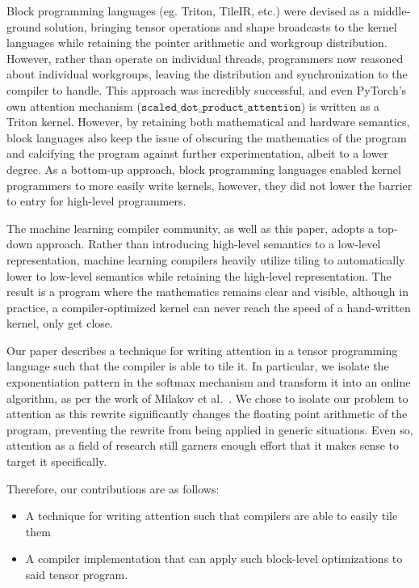 \documentclass[review, anonymous, acmsmall]{acmart}
\begin{document}
Block programming languages (eg. Triton, TileIR, etc.) were devised as a middle-ground solution, bringing tensor operations and shape broadcasts to the kernel languages while retaining the pointer arithmetic and workgroup distribution. However, rather than operate on individual threads, programmers now reasoned about individual workgroups, leaving the distribution and synchronization to the compiler to handle. This approach was incredibly successful, and even PyTorch's own attention mechanism ($\texttt{scaled\_dot\_product\_attention}$) is written as a Triton kernel. However, by retaining both mathematical and hardware semantics, block languages also keep the issue of obscuring the mathematics of the program and calcifying the program against further experimentation, albeit to a lower degree. As a bottom-up approach, block programming languages enabled kernel programmers to more easily write kernels, however, they did not lower the barrier to entry for high-level programmers.

The machine learning compiler community, as well as this paper, adopts a top-down approach. Rather than introducing high-level semantics to a low-level representation, machine learning compilers heavily utilize tiling to automatically lower to low-level semantics while retaining the high-level representation. The result is a program where the mathematics remains clear and visible, although in practice, a compiler-optimized kernel can never reach the speed of a hand-written kernel, only get close.

Our paper describes a technique for writing attention in a tensor programming language such that the compiler is able to tile it. In particular, we isolate the exponentiation pattern in the softmax mechanism and transform it into an online algorithm, as per the work of Milakov et al.~\cite{milakov_online_2018}. We chose to isolate our problem to attention as this rewrite significantly changes the floating point arithmetic of the program, preventing the rewrite from being applied in generic situations. Even so, attention as a field of research still garners enough effort that it makes sense to target it specifically.

\vspace{.5em}
\noindent
Therefore, our contributions are as follows:
\begin{itemize}
	\item A technique for writing attention such that compilers are able to easily tile them
  \item A compiler implementation that can apply such block-level optimizations to said tensor program.
\end{itemize}
\end{document}
